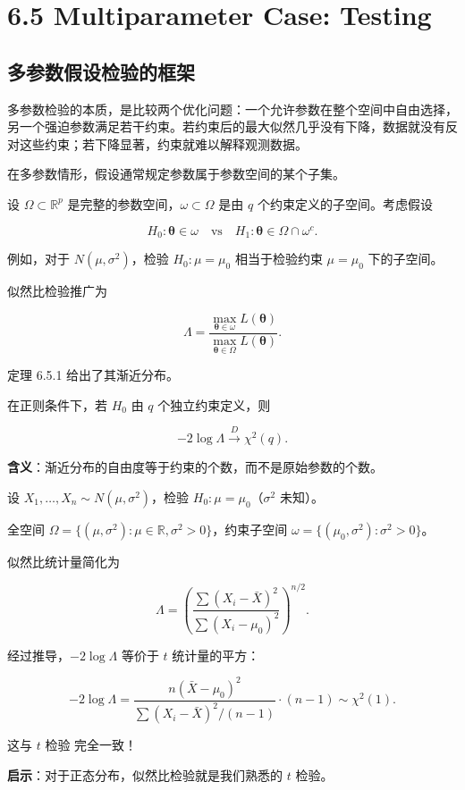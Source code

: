 \section{6.5 Multiparameter Case: Testing}\label{sec:6.5}

\subsection{多参数假设检验的框架}

多参数检验的本质，是比较两个优化问题：一个允许参数在整个空间中自由选择，另一个强迫参数满足若干约束。若约束后的最大似然几乎没有下降，数据就没有反对这些约束；若下降显著，约束就难以解释观测数据。

在多参数情形，假设通常规定参数属于参数空间的某个子集。

设 $\Omega \subset \mathbb{R}^p$ 是完整的参数空间，$\omega \subset \Omega$ 是由 $q$ 个约束定义的子空间。考虑假设

\[
H_0: \boldsymbol{\theta} \in \omega \quad \text{vs} \quad H_1: \boldsymbol{\theta} \in \Omega \cap \omega^c.
\label{eq:multiparameter-hypothesis}
\]

例如，对于 $N(\mu, \sigma^2)$，检验 $H_0: \mu = \mu_0$ 相当于检验约束 $\mu = \mu_0$ 下的子空间。

似然比检验推广为

\[
\Lambda = \frac{\max_{\boldsymbol{\theta} \in \omega} L(\boldsymbol{\theta})}{\max_{\boldsymbol{\theta} \in \Omega} L(\boldsymbol{\theta})}.
\label{eq:multiparameter-lrt}
\]

定理 6.5.1 给出了其渐近分布。

\begin{theorem}[多参数似然比检验的渐近分布]\label{th:multiparameter-lrt}
在正则条件下，若 $H_0$ 由 $q$ 个独立约束定义，则

\[
-2\log\Lambda \xrightarrow{D} \chi^2(q).
\label{eq:multiparameter-lrt-asymptotic}
\]
\end{theorem}

\textbf{含义}：渐近分布的自由度等于约束的个数，而不是原始参数的个数。

\begin{example}[正态均值的检验]\label{ex:normal-mean-test-multiparameter}
设 $X_1, \ldots, X_n \sim N(\mu, \sigma^2)$，检验 $H_0: \mu = \mu_0$（$\sigma^2$ 未知）。

全空间 $\Omega = \{(\mu, \sigma^2): \mu \in \mathbb{R}, \sigma^2 > 0\}$，约束子空间 $\omega = \{(\mu_0, \sigma^2): \sigma^2 > 0\}$。

似然比统计量简化为

\[
\Lambda = \left( \frac{\sum(X_i - \bar{X})^2}{\sum(X_i - \mu_0)^2} \right)^{n/2}.
\]

经过推导，$-2\log\Lambda$ 等价于 $t$ 统计量的平方：

\[
-2\log\Lambda = \frac{n(\bar{X} - \mu_0)^2}{\sum(X_i - \bar{X})^2/(n-1)} \cdot (n-1) \sim \chi^2(1).
\]

这与 $t$ 检验 完全一致！

\textbf{启示}：对于正态分布，似然比检验就是我们熟悉的 $t$ 检验。
\end{example}

